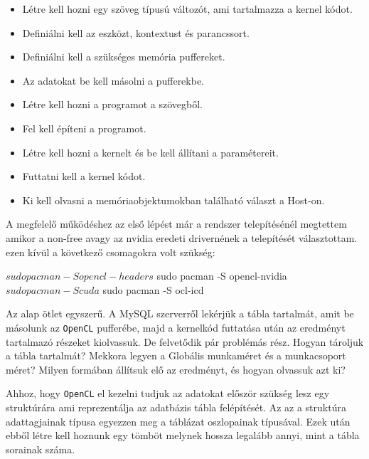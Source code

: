 \begin{itemize}
\item Létre kell hozni egy szöveg típusú változót, ami tartalmazza a kernel kódot.
\item Definiálni kell az eszközt, kontextust és parancssort.
\item Definiálni kell a szükséges memória puffereket.
\item Az adatokat be kell másolni a pufferekbe.
\item Létre kell hozni a programot a szövegből.
\item Fel kell építeni a programot.
\item Létre kell hozni a kernelt és be kell állítani a paramétereit.
\item Futtatni kell a kernel kódot.
\item Ki kell olvasni a memóriaobjektumokban található választ a Host-on.

\end{itemize}



A megfelelő működéshez az első lépést már a rendszer telepítésénél megtettem amikor a non-free avagy az nvidia eredeti drivernének a telepítését választottam.
ezen kívül a következő csomagokra volt szükség: 

\begin{python}
$ sudo pacman -S opencl-headers
$ sudo pacman -S opencl-nvidia
$ sudo pacman -S cuda
$ sudo pacman -S ocl-icd
\end{python}



Az alap ötlet egyszerű. A MySQL szerverről lekérjük a tábla tartalmát, amit be másolunk az \texttt{OpenCL} pufferébe, majd a kernelkód futtatása után az eredményt tartalmazó részeket kiolvassuk. De felvetődik pár problémás rész. Hogyan tároljuk a tábla tartalmát? Mekkora legyen a Globális munkaméret és a munkacsoport méret? Milyen formában állítsuk elő az eredményt, és hogyan olvassuk azt ki?



Ahhoz, hogy \texttt{OpenCL} el kezelni tudjuk az adatokat először szükség lesz egy struktúrára ami reprezentálja az adatbázis tábla felépítését. Az az a struktúra adattagjainak típusa egyezzen meg a táblázat oszlopainak típusával. Ezek után ebből létre kell hoznunk egy tömböt melynek hossza legalább annyi, mint a tábla sorainak száma.

